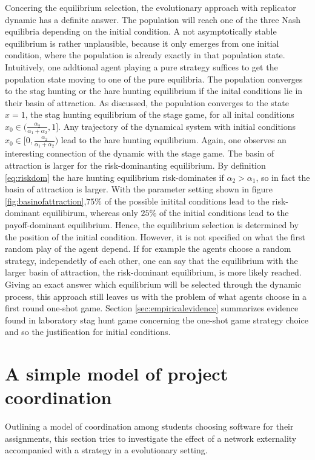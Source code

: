\documentclass[11pt]{article}
\begin{document}
Concering the equilibrium selection, the evolutionary approach with replicator
dynamic has a definite answer. The population will reach one of the three
Nash equilibria depending on the initial condition. 
A not asymptotically stable equilibrium is rather unplausible,
because it only emerges from one initial condition, where the population
is already exactly in that population state. 
Intuitively, one addtional agent playing
a pure strategy suffices to get the population state moving to one of the
pure equilibria. The population converges to the stag hunting or the hare
hunting equilibrium if the inital conditions lie in their basin of attraction.
As discussed, the population converges to the state $x=1$, the stag hunting 
equilibrium of the stage game, for all inital conditions 
$x_0 \in (\frac{\alpha_2}{\alpha_1+\alpha_2},1]$. Any trajectory of the 
dynamical system with initial conditions 
$x_0 \in [0,\frac{\alpha_2}{\alpha_1+\alpha_2})$ lead to the hare hunting
equilibrium. Again, one observes an interesting connection of the 
dynamic with the stage game. The basin of attraction is larger for the
risk-dominanting equilibrium. By definition \ref{eq:riskdom} 
the hare hunting equilibrium risk-dominates if $\alpha_2 > \alpha_1$,
so in fact the basin of attraction is larger. With the parameter setting shown
in figure \ref{fig:basinofattraction},$75\%$ of the possible initital 
conditions lead to the risk-dominant equilibirum, whereas only $25\%$ of the 
initial conditions lead to the payoff-dominant equilibrium. 
Hence, the equilibrium selection is determined by the position of the initial
condition. However, it is not specified on what the first random play
of the agent depend. If for example the agents choose a random strategy,
independetly of each other, one can say that the equilibrium with the
larger basin of attraction, the risk-dominant equilibrium, is more likely 
reached.  
Giving an exact answer which equilibrium will be selected through the dynamic
process, this approach still leaves us with the problem of what agents 
choose in a first round one-shot game. Section \ref{sec:empiricalevidence} 
summarizes evidence found in laboratory stag hunt game concerning the 
one-shot game strategy choice and so the justification for initial conditions.

\section{A simple model of project coordination}
Outlining a model of coordination among students choosing software for their
assignments, this section tries to investigate the effect of a network 
externality accompanied with a strategy in a evolutionary setting.
\end{document}
